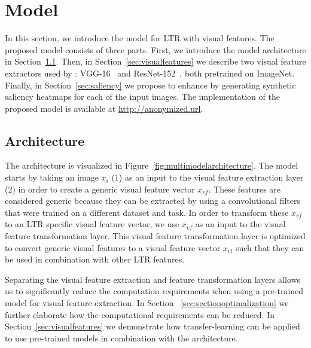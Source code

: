 
\section{\protect\modelname{} Model}
In this section, we introduce the \modelname{} model for \ac{LTR} with visual features.
The proposed model consists of three parts.
First, we introduce the model architecture in Section~\ref{sec:multimodal}.
Then, in Section~\ref{sec:visualfeatures} we describe two visual feature extractors used by \modelname{}:
VGG-16~\cite{simonyan2014very} and ResNet-152~\cite{he2016deep}, both pretrained on ImageNet.
Finally, in Section~\ref{sec:saliency} we propose to enhance \modelname{} by generating synthetic saliency heatmaps for each of the input images.
 The implementation of the proposed \modelname{} model is available at \url{http://anonymized.url}.

\subsection{Architecture} \label{sec:multimodal}
The \modelname{} architecture is visualized in Figure~\ref{fig:multimodelarchitecture}. 
The model starts by taking an image $x_i$ (1) as an input to the visual feature extraction layer (2) in order to create a generic visual feature vector $x_{vf}$. 
These features are considered generic because they can be extracted by using a convolutional filters that were trained on a different dataset and task. 
In order to transform these $x_{vf}$ to an \ac{LTR} specific visual feature vector, we use $x_{vf}$ as an input to the visual feature transformation layer.
This visual feature transformation layer is optimized to convert generic visual features to a visual feature vector $x_{vl}$ such that they can be used in combination with other \ac{LTR} features. 

Separating the visual feature extraction and feature transformation layers allows us to significantly reduce the computation requirements when using a pre-trained model for visual feature extraction. 
In Section ~\ref{sec:sectionoptimalization} we further elaborate how the computational requirements can be reduced. In Section~\ref{sec:visualfeatures} we demonstrate how transfer-learning can be applied to use pre-trained models in combination with the \modelname{} architecture.

